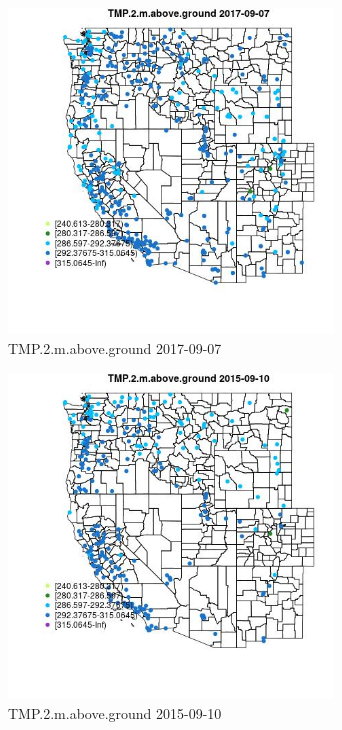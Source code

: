 \begin{figure} 
\centering  
\includegraphics[width=0.77\textwidth]{Code_Outputs/Report_ML_input_PM25_Step4_part_e_de_duplicated_aves_compiled_2019-05-21wNAs_MapObsTMP2maboveground2017-09-07.jpg} 
\caption{\label{fig:Report_ML_input_PM25_Step4_part_e_de_duplicated_aves_compiled_2019-05-21wNAsMapObsTMP2maboveground2017-09-07}TMP.2.m.above.ground 2017-09-07} 
\end{figure} 
 

\begin{figure} 
\centering  
\includegraphics[width=0.77\textwidth]{Code_Outputs/Report_ML_input_PM25_Step4_part_e_de_duplicated_aves_compiled_2019-05-21wNAs_MapObsTMP2maboveground2015-09-10.jpg} 
\caption{\label{fig:Report_ML_input_PM25_Step4_part_e_de_duplicated_aves_compiled_2019-05-21wNAsMapObsTMP2maboveground2015-09-10}TMP.2.m.above.ground 2015-09-10} 
\end{figure} 
 

